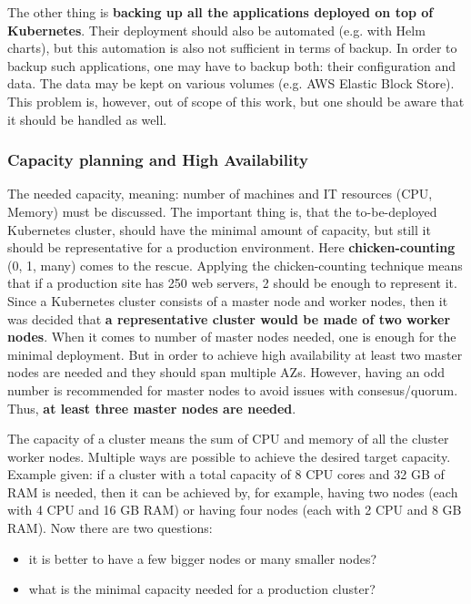 The other thing is \textbf{backing up all the applications deployed on top of Kubernetes}. Their deployment should also be automated (e.g. with Helm charts), but this automation is also not sufficient in terms of backup. In order to backup such applications, one may have to backup both: their configuration and data. The data may be kept on various volumes (e.g. AWS Elastic Block Store). This problem is, however, out of scope of this work, but one should be aware that it should be handled as well.

\subsubsection{Capacity planning and High Availability}

The needed capacity, meaning: number of machines and IT resources (CPU, Memory) must be discussed. The important thing is, that the to-be-deployed Kubernetes cluster, should have the minimal amount of capacity, but still it should be representative for a production environment. Here \textbf{chicken-counting} (0, 1, many) comes to the rescue. Applying the chicken-counting technique means that if a production site has 250 web servers, 2 should be enough to represent it\cite{book-cicd}. Since a Kubernetes cluster consists of a master node and worker nodes, then it was decided that \textbf{a representative cluster would be made of two worker nodes}. When it comes to number of master nodes needed, one is enough for the minimal deployment. But in order to achieve high availability at least two master nodes are needed and they should span multiple AZs\cite{article-aws-architecting}. However, having an odd number is recommended for master nodes to avoid issues with consesus/quorum. Thus, \textbf{at least three master nodes are needed}\cite{online-ha-k8s-blog}\cite{online-kops-ha}.

The capacity of a cluster means the sum of CPU and memory of all the cluster worker nodes. Multiple ways are possible to achieve the desired target capacity. Example given: if a cluster with a total capacity of 8 CPU cores and 32 GB of RAM is needed, then it can be achieved by, for example, having two nodes (each with 4 CPU and 16 GB RAM) or having four nodes (each with 2 CPU and 8 GB RAM)\cite{kubernetes-node-size}. Now there are two questions:
\begin{itemize}
\item it is better to have a few bigger nodes or many smaller nodes?
\item what is the minimal capacity needed for a production cluster?
\end{itemize}

